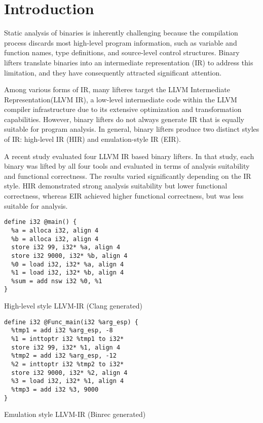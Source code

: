 \section{Introduction}
Static analysis of binaries is inherently challenging because the compilation
process discards most high-level program information\cite{compiler-level-ir}, such as variable and
function names, type definitions, and source-level control structures. Binary
lifters translate binaries into an intermediate representation (IR) to address
this limitation, and they have consequently attracted significant attention.

Among various forms of IR, many lifteres target the LLVM Intermediate
Representation(LLVM IR), a low-level intermediate code within the LLVM compiler
infrastructure due to its extensive optimization and transformation
capabilities. However, binary lifters do not always generate IR that is equally
suitable for program analysis. In general, binary lifters produce two distinct
styles of IR: high-level IR (HIR) and emulation-style IR (EIR). 

A recent study evaluated four LLVM IR based binary lifters\cite{snp-sok}. In that study, each
binary was lifted by all four tools and evaluated in terms of analysis
suitability and functional correctness. The results varied significantly
depending on the IR style. HIR demonstrated strong analysis suitability but
lower functional correctness, whereas EIR achieved higher functional
correctness, but was less suitable for analysis.

\begin{listing}[ht]
\begin{verbatim}
define i32 @main() {
  %a = alloca i32, align 4
  %b = alloca i32, align 4
  store i32 99, i32* %a, align 4
  store i32 9000, i32* %b, align 4
  %0 = load i32, i32* %a, align 4
  %1 = load i32, i32* %b, align 4
  %sum = add nsw i32 %0, %1
}
\end{verbatim}
\caption{High-level style LLVM-IR (Clang generated)}
\label{lst:hir}
\end{listing}

\begin{listing}[ht]
\begin{verbatim}
define i32 @Func_main(i32 %arg_esp) {
  %tmp1 = add i32 %arg_esp, -8
  %1 = inttoptr i32 %tmp1 to i32*
  store i32 99, i32* %1, align 4
  %tmp2 = add i32 %arg_esp, -12
  %2 = inttoptr i32 %tmp2 to i32*
  store i32 9000, i32* %2, align 4
  %3 = load i32, i32* %1, align 4 
  %tmp3 = add i32 %3, 9000
}
\end{verbatim}
\caption{Emulation style LLVM-IR (Binrec generated)}
\label{lst:eir}
\end{listing}

